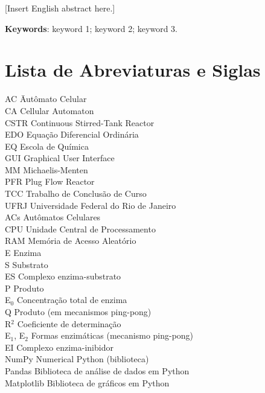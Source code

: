 \documentclass[12pt,oneside]{report}
\begin{document}
[Insert English abstract here.]

\medskip

\textbf{Keywords}: keyword 1; keyword 2; keyword 3.
\newpage

\listoffigures
\newpage

\listoftables
\newpage

\chapter*{Lista de Abreviaturas e Siglas}
\begin{tabbing}
    AC \hspace{2cm} \= Autômato Celular \\
    CA \> Cellular Automaton \\
    CSTR \> Continuous Stirred-Tank Reactor \\
    EDO \> Equação Diferencial Ordinária \\
    EQ \> Escola de Química \\
    GUI \> Graphical User Interface \\
    MM \> Michaelis-Menten \\
    PFR \> Plug Flow Reactor \\
    TCC \> Trabalho de Conclusão de Curso \\
    UFRJ \> Universidade Federal do Rio de Janeiro \\
    ACs \> Autômatos Celulares \\
    CPU \> Unidade Central de Processamento \\
    RAM \> Memória de Acesso Aleatório \\
    E \> Enzima \\
    S \> Substrato \\
    ES \> Complexo enzima-substrato \\
    P \> Produto \\
    E$_0$ \> Concentração total de enzima \\
    Q \> Produto (em mecanismos ping-pong) \\
    R$^2$ \> Coeficiente de determinação \\
    E$_1$, E$_2$ \> Formas enzimáticas (mecanismo ping-pong) \\
    EI \> Complexo enzima-inibidor \\
    NumPy \> Numerical Python (biblioteca) \\
    Pandas \> Biblioteca de análise de dados em Python \\
    Matplotlib \> Biblioteca de gráficos em Python \\
\end{tabbing}
\end{document}
